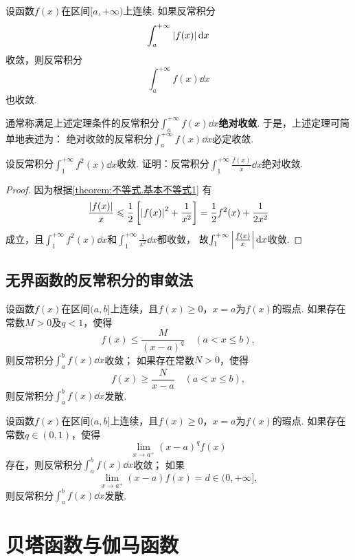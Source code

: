 \begin{theorem}\label{theorem:定积分.绝对收敛的无穷限反常积分必收敛}
设函数\(f(x)\)在区间\([a,+\infty)\)上连续.
如果反常积分\[
\int_a^{+\infty} \abs{f(x)} \dd{x}
\]收敛，则反常积分\[
\int_a^{+\infty} f(x) \dd{x}
\]也收敛.
\end{theorem}
通常称满足上述定理条件的反常积分\(\int_a^{+\infty} f(x) \dd{x}\)\textbf{绝对收敛}.
于是，上述定理可简单地表述为：
绝对收敛的反常积分\(\int_a^{+\infty} f(x) \dd{x}\)必定收敛.

\begin{example}
设反常积分\(\int_1^{+\infty} f^2(x) \dd{x}\)收敛.
证明：反常积分\(\int_1^{+\infty} \frac{f(x)}{x} \dd{x}\)绝对收敛.
\begin{proof}
因为根据\cref{theorem:不等式.基本不等式1} 有\[
\frac{\abs{f(x)}}{x} \leqslant \frac{1}{2} \left[
	\abs{f(x)}^2 + \frac{1}{x^2}
\right]
= \frac{1}{2} f^2(x) + \frac{1}{2x^2}
\]成立，且\(\int_1^{+\infty} f^2(x) \dd{x}\)和\(\int_1^{+\infty} \frac{1}{x^2} \dd{x}\)都收敛，%
故\(\int_1^{+\infty} \abs{\frac{f(x)}{x}} \dd{x}\)收敛.
\end{proof}
\end{example}

\subsection{无界函数的反常积分的审敛法}
\begin{theorem}[比较审敛法]\label{theorem:定积分.无界函数的反常积分的比较审敛法}
设函数\(f(x)\)在区间\((a,b]\)上连续，且\(f(x) \geqslant 0\)，\(x=a\)为\(f(x)\)的瑕点.
如果存在常数\(M > 0\)及\(q < 1\)，使得\[
f(x) \leqslant \frac{M}{(x-a)^q} \quad (a < x \leqslant b),
\]则反常积分\(\int_a^b f(x) \dd{x}\)收敛；
如果存在常数\(N > 0\)，使得\[
f(x) \geqslant \frac{N}{x - a} \quad (a < x \leqslant b),
\]则反常积分\(\int_a^b f(x) \dd{x}\)发散.
\end{theorem}

\begin{theorem}[极限审敛法]\label{theorem:定积分.无界函数的反常积分的极限审敛法}
设函数\(f(x)\)在区间\((a,b]\)上连续，且\(f(x) \geqslant 0\)，\(x=a\)为\(f(x)\)的瑕点.
如果存在常数\(q \in (0,1)\)，使得\[
\lim\limits_{x \to a^+} (x-a)^q f(x)
\]存在，则反常积分\(\int_a^b f(x) \dd{x}\)收敛；
如果\[
\lim\limits_{x \to a^+} (x-a) f(x) = d \in (0,+\infty],
\]则反常积分\(\int_a^b f(x) \dd{x}\)发散.
\end{theorem}

\section{贝塔函数与伽马函数}
